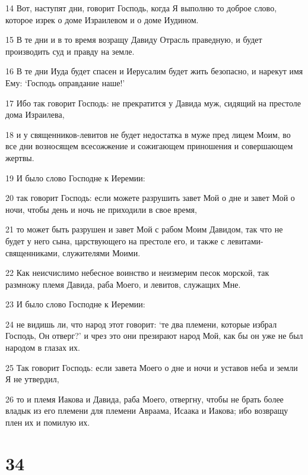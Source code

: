 \par 14 Вот, наступят дни, говорит Господь, когда Я выполню то доброе слово, которое изрек о доме Израилевом и о доме Иудином.
\par 15 В те дни и в то время возращу Давиду Отрасль праведную, и будет производить суд и правду на земле.
\par 16 В те дни Иуда будет спасен и Иерусалим будет жить безопасно, и нарекут имя Ему: `Господь оправдание наше!'
\par 17 Ибо так говорит Господь: не прекратится у Давида муж, сидящий на престоле дома Израилева,
\par 18 и у священников-левитов не будет недостатка в муже пред лицем Моим, во все дни возносящем всесожжение и сожигающем приношения и совершающем жертвы.
\par 19 И было слово Господне к Иеремии:
\par 20 так говорит Господь: если можете разрушить завет Мой о дне и завет Мой о ночи, чтобы день и ночь не приходили в свое время,
\par 21 то может быть разрушен и завет Мой с рабом Моим Давидом, так что не будет у него сына, царствующего на престоле его, и также с левитами-священниками, служителями Моими.
\par 22 Как неисчислимо небесное воинство и неизмерим песок морской, так размножу племя Давида, раба Моего, и левитов, служащих Мне.
\par 23 И было слово Господне к Иеремии:
\par 24 не видишь ли, что народ этот говорит: `те два племени, которые избрал Господь, Он отверг?' и чрез это они презирают народ Мой, как бы он уже не был народом в глазах их.
\par 25 Так говорит Господь: если завета Моего о дне и ночи и уставов неба и земли Я не утвердил,
\par 26 то и племя Иакова и Давида, раба Моего, отвергну, чтобы не брать более владык из его племени для племени Авраама, Исаака и Иакова; ибо возвращу плен их и помилую их.

\chapter{34}

